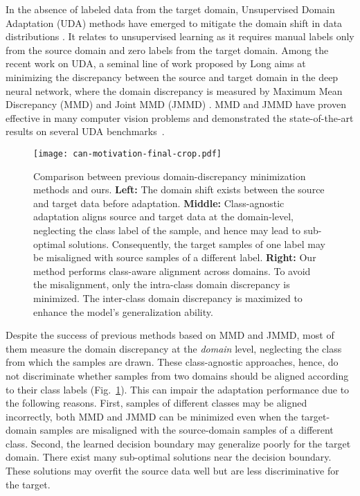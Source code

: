 \documentclass[10pt,twocolumn,letterpaper]{article}
\begin{document}
In the absence of labeled data from the target domain, Unsupervised Domain Adaptation (UDA) methods have emerged to mitigate the domain shift in data distributions \cite{ben2007analysis,ben2010theory,bruzzone2010domain,tzeng2017adversarial,saenko2010adapting,hoffman2016fcns,bousmalis2017unsupervised,hoffman2017cycada}. 
It relates to unsupervised learning as it requires manual labels only from the source domain and zero labels from the target domain.
Among the recent work on UDA, a seminal line of work proposed by Long \etal \cite{long2015learning,long2017deep} aims at minimizing the discrepancy between the source and target domain in the deep neural network, where the domain discrepancy is measured by Maximum Mean Discrepancy (MMD) \cite{long2015learning} and Joint MMD (JMMD) \cite{long2017deep}. 
MMD and JMMD have proven effective in many computer vision problems and demonstrated the state-of-the-art results on several UDA benchmarks~\cite{long2015learning,long2017deep}.

\begin{figure}[t]
\begin{center}
\texttt{[image: can-motivation-final-crop.pdf]}
\end{center}
\caption{\label{fig:motivation}
Comparison between previous domain-discrepancy minimization methods and ours.
\textbf{Left:} The domain shift exists between the source and target data before adaptation.
\textbf{Middle:}
Class-agnostic adaptation aligns source and target data at the domain-level, neglecting the class label of the sample, and hence may lead to sub-optimal solutions.
Consequently, the target samples of one label may be misaligned with source samples of a different label. \textbf{Right:} Our method performs class-aware alignment across domains. 
To avoid the misalignment, only the intra-class domain discrepancy is minimized. 
The inter-class domain discrepancy is maximized to enhance the model's generalization ability.}
\end{figure}
Despite the success of previous methods based on MMD and JMMD, most of them measure the domain discrepancy at the \textit{domain} level, neglecting the class from which the samples are drawn. These class-agnostic approaches, hence, do not discriminate whether samples from two domains should be aligned according to their class labels 
(Fig.~\ref{fig:motivation}). This can impair the adaptation performance due to the following reasons.
First, samples of different classes may be aligned incorrectly, 
\eg both MMD and JMMD can be minimized even when the target-domain samples are misaligned with the source-domain samples of a different class. 
Second, the learned decision boundary may generalize poorly for the target domain. There exist many sub-optimal solutions near the decision boundary. 
These solutions may overfit the source data well but are less discriminative for the target. 
\end{document}
